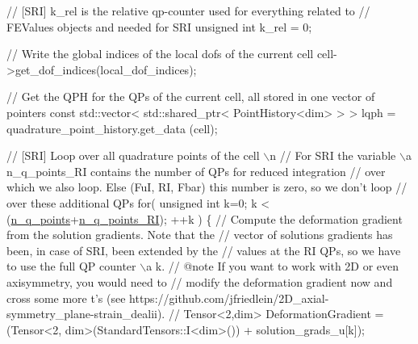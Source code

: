\begin{DoxyCode}
        \textcolor{comment}{// [SRI] k\_rel is the relative qp-counter used for everything related to}
        \textcolor{comment}{// FEValues objects and needed for SRI}
         \textcolor{keywordtype}{unsigned} \textcolor{keywordtype}{int} k\_rel = 0;

        \textcolor{comment}{// Write the global indices of the local dofs of the current cell}
         cell->get\_dof\_indices(local\_dof\_indices);

        \textcolor{comment}{// Get the QPH for the QPs of the current cell, all stored in one vector of pointers}
         \textcolor{keyword}{const} std::vector< std::shared\_ptr< PointHistory<dim> > > lqph = quadrature\_point\_history.get\_data
      (cell);

        \textcolor{comment}{// [SRI] Loop over all quadrature points of the cell \(\backslash\)n}
        \textcolor{comment}{// For SRI the variable \(\backslash\)a n\_q\_points\_RI contains the number of QPs for reduced integration}
        \textcolor{comment}{// over which we also loop. Else (FuI, RI, Fbar) this number is zero, so we don't loop}
        \textcolor{comment}{// over these additional QPs}
        \textcolor{keywordflow}{for}( \textcolor{keywordtype}{unsigned} \textcolor{keywordtype}{int} k=0; k < (\hyperlink{assembly__routine__SRI_8cc_afd52b693751274175b93a58458201e6b}{n\_q\_points}+\hyperlink{assembly__routine__SRI_8cc_a0b72b2a33d52b7597b87df35b5b92415}{n\_q\_points\_RI}); ++k )
        \{
            \textcolor{comment}{// Compute the deformation gradient from the solution gradients. Note that the}
            \textcolor{comment}{// vector of solutions gradients has been, in case of SRI, been extended by the}
            \textcolor{comment}{// values at the RI QPs, so we have to use the full QP counter \(\backslash\)a k.}
            \textcolor{comment}{// @note If you want to work with 2D or even axisymmetry, you would need to}
            \textcolor{comment}{// modify the deformation gradient now and cross some more t's (see
       https://github.com/jfriedlein/2D\_axial-symmetry\_plane-strain\_dealii).}
            \textcolor{comment}{//}
             Tensor<2,dim> DeformationGradient = (Tensor<2, dim>(StandardTensors::I<dim>()) + 
      solution\_grads\_u[k]);


\end{DoxyCode}
